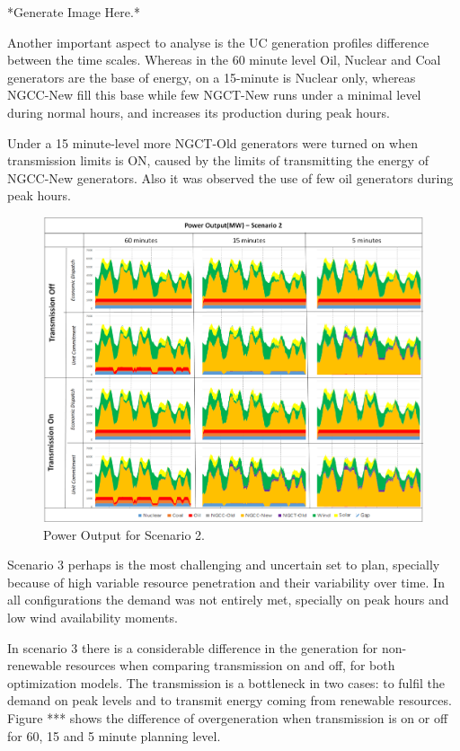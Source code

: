 \documentclass[12pt,LUDisStyle,twosided]{book}
\begin{document}
*Generate Image Here.*

Another important aspect to analyse is the UC generation profiles difference between the time scales. Whereas in the 60 minute level Oil, Nuclear and Coal generators are the base of energy, on a 15-minute is  Nuclear only, whereas NGCC-New fill this base while few NGCT-New runs under a minimal level during normal hours, and increases its production during peak hours. 

Under a 15 minute-level more NGCT-Old generators were turned on when transmission limits is ON, caused by the limits of transmitting the energy of NGCC-New generators. Also it was observed the use of few oil generators during peak hours.

\begin{figure} 
  \centering
  
	  \includegraphics[width=\textwidth,height=\textheight,keepaspectratio]{PowerOutputScenario2.png}
  
  \caption{Power Output for Scenario 2.}
  \label{fig:powerOutputScenario2}
\end{figure}



Scenario 3 perhaps is the most challenging and uncertain set to plan, specially because of high variable resource penetration and their variability over time. In all configurations the demand was not entirely met, specially on peak hours and low wind availability moments. 

In scenario 3 there is a considerable difference in the generation for non-renewable resources when comparing transmission on and off, for both optimization models. The transmission is a bottleneck in two cases: to fulfil the demand on peak levels and to transmit energy coming from renewable resources. Figure *** shows the difference of overgeneration when transmission is on or off for 60, 15 and 5 minute planning level.
\end{document}
